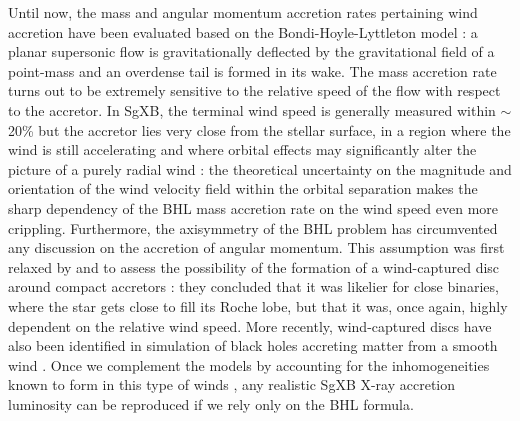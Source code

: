 \documentclass{aa}
\newcommand{\sgx}{SgXB\xspace}
\begin{document}
Until now, the mass and angular momentum accretion rates pertaining wind accretion have been evaluated based on the Bondi-Hoyle-Lyttleton model \citep[BHL, see][for a review]{Edgar:2004ip} : a planar supersonic flow is gravitationally deflected by the gravitational field of a point-mass and an overdense tail is formed in its wake. The mass accretion rate turns out to be extremely sensitive to the relative speed of the flow with respect to the accretor. In \sgx, the terminal wind speed is generally measured within $\sim$20\% but the accretor lies very close from the stellar surface, in a region where the wind is still accelerating and where orbital effects may significantly alter the picture of a purely radial wind : the theoretical uncertainty on the magnitude and orientation of the wind velocity field within the orbital separation makes the sharp dependency of the BHL mass accretion rate on the wind speed even more crippling. Furthermore, the axisymmetry of the BHL problem has circumvented any discussion on the accretion of angular momentum. This assumption was first relaxed by \cite{Illarionov1975} and \cite{Shapiro1976} to assess the possibility of the formation of a wind-captured disc around compact accretors : they concluded that it was likelier for close binaries, where the star gets close to fill its Roche lobe, but that it was, once again, highly dependent on the relative wind speed. More recently, wind-captured discs have also been identified in simulation of black holes accreting matter from a smooth wind \citep{Walder2014}. Once we complement the models by accounting for the inhomogeneities known to form in this type of winds \citep{Sundqvist2017}, any realistic \sgx X-ray accretion luminosity can be reproduced if we rely only on the BHL formula.
\end{document}

